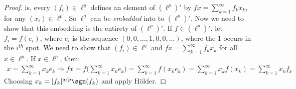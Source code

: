 \documentclass[crop=false,class=article,oneside]{standalone}
\begin{document}
\begin{proof}
                is, every $(f_{i})\in\ell^{q}$ defines an element
                of $(\ell^{p})'$ by
                $fx=\sum_{k=1}^{\infty}f_{k}x_{k}$, for any
                $(x_{i})\in\ell^{p}$. So $\ell^{q}$ can
                be \textit{embedded} into to $(\ell^{p})'$.
                Now we need to show that this embedding is
                the entirety of $(\ell^{p})'$. If
                $f\in(\ell^{p})'$, let
                $f_{i}=f(e_{i})$, where $e_{i}$ is the
                sequence $(0,0,\hdots,1,0,0,\hdots)$, where
                the 1 occurs in the $i^{th}$ spot. We need
                to show that $(f_{i})\in\ell^{q}$ and
                $fx=\sum_{k=1}^{\infty}f_{k}x_{k}$
                for all $x\in\ell^{p}$. If $x\in\ell^{p}$, then:
                \begin{align*}
                    x=\sum_{k=1}^{\infty}x_{k}e_{k}
                    \Rightarrow
                    fx=f\Big(\sum_{k=1}^{\infty}x_{k}e_{k}\Big)
                    =\sum_{k=1}^{\infty}f(x_{k}e_{k})
                    =\sum_{k=1}^{\infty}x_{k}f(x_{k})
                    =\sum_{k=1}^{\infty}x_{k}f_{k}
                \end{align*}
                Choosing $x_{k}=|f_{k}|^{q/p}\sgn(f_{k})$ and apply
                H\"{o}lder.
            \end{proof}
\end{document}
